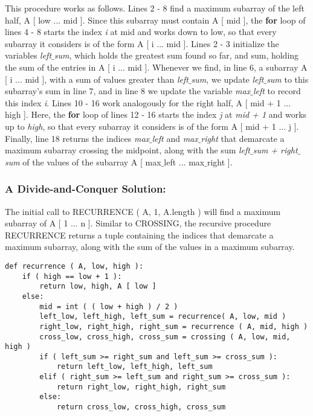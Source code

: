 This procedure works as follows. Lines 2 - 8 find a maximum subarray of the left half, A [ low ... mid ]. Since this subarray must contain A [ mid ], the {\bfseries for} loop of lines 4 - 8 starts the index {\itshape i} at mid and works down to low, so that every subarray it considers is of the form A [ i ... mid ]. Lines 2 - 3 initialize the variables {\itshape left$\_$sum}, which holds the greatest sum found so far, and sum, holding the sum of the entries in A [ i ... mid ]. Whenever we find, in line 6, a subarray A [ i ... mid ], with a sum of values greater than {\itshape left$\_$sum}, we update {\itshape left$\_$sum} to this subarray’s sum in line 7, and in line 8 we update the variable {\itshape max$\_$left} to record this index {\itshape i}. Lines 10 - 16 work analogously for the right half, A [ mid + 1 ... high ]. Here, the {\bfseries for} loop of lines 12 - 16 starts the index {\itshape j } at {\itshape mid + 1} and works up to {\itshape high}, so that every subarray it considers is of the form A [ mid + 1 ... j ]. Finally, line 18 returns the indices {\itshape max$\_$left} and {\itshape max$\_$right} that demarcate a maximum subarray crossing the midpoint, along with the sum {\itshape left$\_$sum + right$\_$sum} of the values of the subarray A [ max$\_$left ... max$\_$right ].

\subsubsection{A Divide-and-Conquer Solution:}

The initial call to RECURRENCE ( A, 1, A.length ) will find a maximum subarray of A [ 1 ... n ]. Similar to CROSSING, the recursive procedure RECURRENCE returns a tuple containing the indices that demarcate a maximum subarray, along with the sum of the values in a maximum subarray. \hfill \break

\begin{lstlisting}
def recurrence ( A, low, high ):
    if ( high == low + 1 ):
        return low, high, A [ low ]
    else:
        mid = int ( ( low + high ) / 2 )
        left_low, left_high, left_sum = recurrence( A, low, mid )
        right_low, right_high, right_sum = recurrence ( A, mid, high )
        cross_low, cross_high, cross_sum = crossing ( A, low, mid, high )
        if ( left_sum >= right_sum and left_sum >= cross_sum ):
            return left_low, left_high, left_sum
        elif ( right_sum >= left_sum and right_sum >= cross_sum ):
            return right_low, right_high, right_sum
        else:
            return cross_low, cross_high, cross_sum
\end{lstlisting} \hfill

